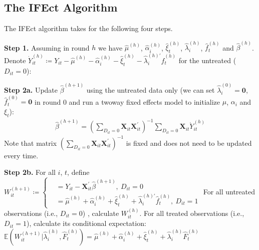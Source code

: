 \documentclass[12pt]{article}
\let\oldcenter\center
\let\oldendcenter\endcenter
\renewenvironment{center}{\setlength\topsep{0pt}\oldcenter}{\oldendcenter}
\newcommand{\E}{\mathbb{E}}
\begin{document}
\subsection{The IFEct Algorithm}\label{sc:algo}

The IFEct algorithm takes for the following four steps. 

\begin{adjustwidth}{20pt}{20pt}

\noindent\textbf{Step 1.} Assuming in round $h$ we have $\hat{\mu}^{(h)}$, 
$\hat{\alpha}_i^{(h)}$, $\hat{\xi}_t^{(h)}$, $ \hat{\lambda}_i^{(h)} $, 
$ \hat{f}_t^{(h)} $ and $ \hat{\beta}^{(h)} $. Denote 
$\dot{Y}_{it}^{(h)} \coloneqq Y_{it} - \hat{\mu}^{(h)} - \hat{\alpha}_i^{(h)} - 
\hat{\xi}_t^{(h)} - \hat{\lambda}_i^{(h)\prime} \hat{f}_t^{(h)} $ 
for the untreated ($ D_{it} = 0 $):

\noindent\textbf{Step 2a.} Update $\hat{\beta}^{(h+1)}$ using the untreated data only (we can set $\hat{\lambda}_{i}^{(0)} = \mathbf{0}$, $\hat{f}_{t}^{(0)} = \mathbf{0}$ in round 0 and run a twoway fixed effects model to initialize $ \mu $, $ \alpha_i $ and $ \xi_t $):
\begin{align*}
  \hat{\beta}^{(h+1)} = 
  \left(\sum_{D_{it} = 0} \mathbf{X}_{it} \mathbf{X}_{it}^{\prime}\right)^{-1}
  \sum_{D_{it} = 0} \mathbf{X}_{it} \dot{Y}_{it}^{(h)}
\end{align*}
Note that matrix $\left(\sum_{D_{it} = 0} \mathbf{X}_{it} \mathbf{X}_{it}^{\prime}\right)^{-1}$ is fixed and does not need to be updated every time.

\noindent\textbf{Step 2b.} For all $i$, $t$, define
\begin{center}
$
W_{it}^{(h+1)} \coloneqq \left\{
\begin{aligned}
& = Y_{it} - \mathbf{X}_{it}^{\prime}\hat{\beta}^{(h+1)}, \ D_{it} = 0 \\
& = \hat{\mu}^{(h)} + \hat{\alpha}_i^{(h)} +
\hat{\xi}_t^{(h)} + \hat{\lambda}_i^{(h)\prime} \hat{f}_t^{(h)}, \ D_{it} = 1
\end{aligned}
\right.
$
\end{center}
For all untreated observations (i.e., $D_{it} = 0$) , calculate $W_{it}^{(h)}$. 
For all treated observations (i.e., $D_{it} = 1$), calculate its conditional expectation:
\begin{center}
   $\E\left(W_{it}^{(h+1)} \big|\hat{\lambda}_{i}^{(h)},\hat{F}_{t}^{(h)}\right) = 
    \hat{\mu}^{(h)} + \hat{\alpha}_i^{(h)} +
\hat{\xi}_t^{(h)} + \hat{\lambda}_{i}^{(h)} \hat{F}_{t}^{(h)}$ 
\end{center}


\end{adjustwidth}
\end{document}
